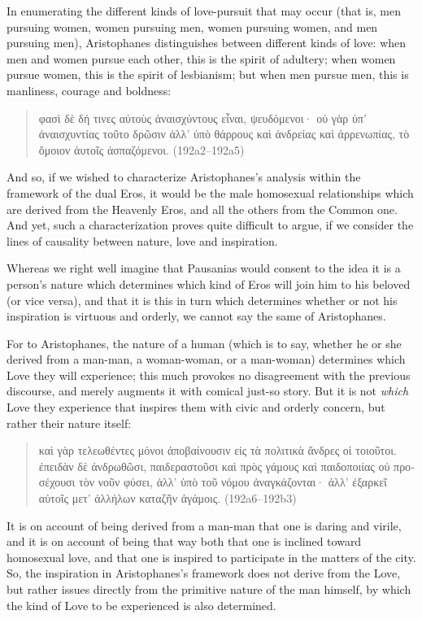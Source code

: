 In enumerating the different kinds of love-pursuit that may occur (that
is, men pursuing women, women pursuing men, women pursuing women, and
men pursuing men), Aristophanes distinguishes between different kinds of
love: when men and women pursue each other, this is the spirit of
adultery; when women pursue women, this is the spirit of lesbianism; but
when men pursue men, this is manliness, courage and boldness:

\begin{quote}
\textgreek{φασὶ δὲ δή τινες αὐτοὺς ἀναισχύντους εἶναι, ψευδόμενοι· οὐ
γὰρ ὑπ' ἀναισχυντίας τοῦτο δρῶσιν ἀλλ' ὑπὸ θάρρους καὶ ἀνδρείας καὶ
ἀρρενωπίας, τὸ ὅμοιον ἀυτοῖς ἀσπαζόμενοι.} (192a2--192a5)
\end{quote}

And so, if we wished to characterize Aristophanes's analysis within the
framework of the dual Eros, it would be the male homosexual
relationships which are derived from the Heavenly Eros, and all the
others from the Common one. And yet, such a characterization proves
quite difficult to argue, if we consider the lines of causality between
nature, love and inspiration.

Whereas we right well imagine that Pausanias would consent to the idea
it is a person's nature which determines which kind of Eros will join
him to his beloved (or vice versa), and that it is this in turn which
determines whether or not his inspiration is virtuous and orderly, we
cannot say the same of Aristophanes.

For to Aristophanes, the nature of a human (which is to say, whether he
or she derived from a man-man, a woman-woman, or a man-woman) determines
which Love they will experience; this much provokes no disagreement with
the previous discourse, and merely augments it with comical just-so
story. But it is not \emph{which} Love they experience that inspires
them with civic and orderly concern, but rather their nature itself:

\begin{quote}
\textgreek{καὶ γὰρ τελεωθέντες μόνοι ἀποβαίνουσιν εἰς τὰ πολιτικὰ ἄνδρες οἱ
τοιοῦτοι. ἐπειδὰν δὲ ἀνδρωθῶσι, παιδεραστοῦσι καὶ πρὸς γάμους καὶ
παιδοποιίας οὐ προσέχουσι τὸν νοῦν φύσει, ἀλλ' ὑπὸ τοῦ νόμου
ἀναγκάζονται· ἀλλ' ἐξαρκεῖ αὐτοῖς μετ' ἀλλήλων καταζῆν ἀγάμοις.}
(192a6--192b3)
\end{quote}

It is on account of being derived from a man-man that one is daring and
virile, and it is on account of being that way both that one is inclined
toward homosexual love, and that one is inspired to participate in the
matters of the city. So, the inspiration in Aristophanes's framework
does not derive from the Love, but rather issues directly from the
primitive nature of the man himself, by which the kind of Love to be
experienced is also determined.

